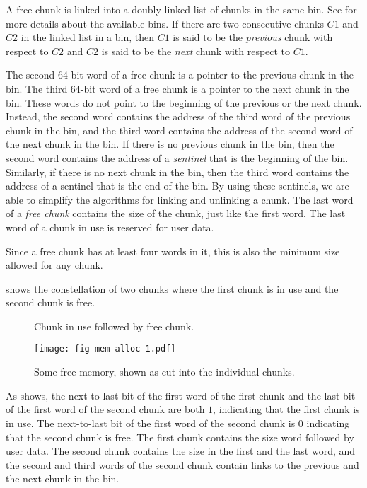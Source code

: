 A free chunk is linked into a doubly linked list of chunks in the same
bin.  See  for more
details about the available bins.  If there are two consecutive chunks
$C1$ and $C2$ in the linked list in a bin, then $C1$ is said to be the
\emph{previous} chunk with respect to $C2$ and $C2$ is said to be the
\emph{next} chunk with respect to $C1$.

The second 64-bit word of a free chunk is a pointer to the previous
chunk in the bin.  The third 64-bit word of a free chunk is a pointer
to the next chunk in the bin.  These words do not point to the
beginning of the previous or the next chunk.  Instead, the second word
contains the address of the third word of the previous chunk in the
bin, and the third word contains the address of the second word of the
next chunk in the bin.  If there is no previous chunk in the bin, then
the second word contains the address of a \emph{sentinel} that is the
beginning of the bin.  Similarly, if there is no next chunk in the
bin, then the third word contains the address of a sentinel that is
the end of the bin.  By using these sentinels, we are able to simplify
the algorithms for linking and unlinking a chunk.  The last word of a
\emph{free chunk} contains the size of the chunk, just like the first
word.  The last word of a chunk in use is reserved for user data.

Since a free chunk has at least four words in it, this is also the
minimum size allowed for any chunk.

 shows the constellation of two chunks where the
first chunk is in use and the second chunk is free.

\begin{figure}
\begin{center}
\end{center}
\caption{\label{fig-chunks2}
Chunk in use followed by free chunk.}
\end{figure}

\begin{figure}
\begin{center}
  \texttt{[image: fig-mem-alloc-1.pdf]}
\end{center}
\caption{Some free memory, shown as cut into the individual chunks.}
\end{figure}



As  shows, the next-to-last bit of the first word
of the first chunk and the last bit of the first word of the second
chunk are both $1$, indicating that the first chunk is in use.  The
next-to-last bit of the first word of the second chunk is $0$
indicating that the second chunk is free.  The first chunk contains
the size word followed by user data.  The second chunk contains the
size in the first and the last word, and the second and third words of
the second chunk contain links to the previous and the next chunk in
the bin.

